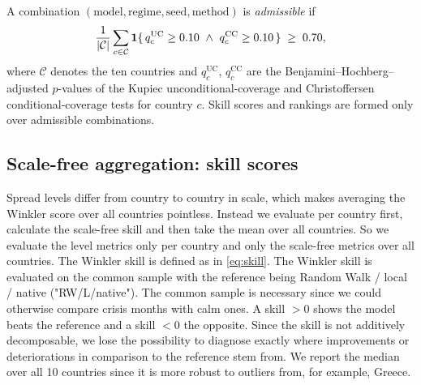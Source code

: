 \label{def:gate}
A combination $(\text{model},\text{regime},\text{seed},\text{method})$ is
\emph{admissible} if
\[
  \frac{1}{|\mathcal{C}|}\sum_{c\in\mathcal{C}}
  \mathbf{1}\{\, q^{\mathrm{UC}}_c \ge 0.10 \ \wedge\ q^{\mathrm{CC}}_c \ge 0.10 \,\}
  \;\ge\; 0.70 ,
\]
where $\mathcal{C}$ denotes the ten countries and $q^{\mathrm{UC}}_c$,
$q^{\mathrm{CC}}_c$ are the Benjamini--Hochberg--adjusted $p$-values of the
Kupiec unconditional-coverage and Christoffersen conditional-coverage tests
for country $c$. Skill scores and rankings are formed only over admissible
combinations.



\subsection{Scale-free aggregation: skill scores}
\label{sec:eval:skill}
Spread levels differ from country to country in scale, which makes averaging the Winkler score over all countries pointless. Instead we evaluate per country first, calculate the scale-free skill and then take the mean over all countries. So we evaluate the level metrics only per country and only the scale-free metrics over all countries. The Winkler skill is defined as in \eqref{eq:skill}.
The Winkler skill is evaluated on the common sample with the reference being Random Walk / local / native ("RW/L/native"). The common sample is necessary since we could otherwise compare crisis months with calm ones. A skill $>0$ shows the model beats the reference and a skill $<0$ the opposite. Since the skill is not additively decomposable, we lose the possibility to diagnose exactly where improvements or deteriorations in comparison to the reference stem from. We report the median over all 10 countries since it is more robust to outliers from, for example, Greece.


%
%

